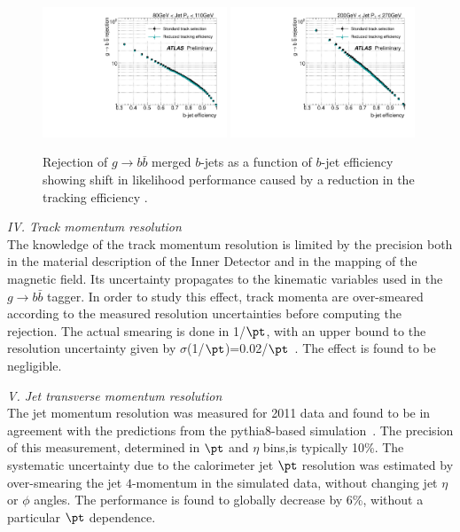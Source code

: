 \begin{figure}[tp]
\centering
\includegraphics[width=0.49\textwidth]{FIGS/systematics/LlhoodKDE_ISO_TrackingUncertaintyTest_rejvseff080.pdf}
\includegraphics[width=0.49\textwidth]{FIGS/systematics/LlhoodKDE_ISO_TrackingUncertaintyTest_rejvseff200.pdf}
\caption{Rejection of $g\rightarrow b \bar{b}$ merged $b$-jets as a function of $b$-jet efficiency showing shift in likelihood performance caused by a reduction in the tracking efficiency .}
\label{fig:trackefficiency}
\end{figure}

\vspace{3mm}
{\em IV. Track momentum resolution}
\\[3mm]
The knowledge of the track momentum resolution is limited by the precision both in the material description of the Inner Detector and in the mapping of the magnetic field. Its uncertainty propagates to the kinematic variables used in the 
$g\rightarrow b \bar{b}$ tagger. In order to study this effect, track momenta are over-smeared according to the measured resolution uncertainties before computing the rejection. The actual smearing is done in 1/$\pt$, with an upper bound to the resolution uncertainty given by $\sigma$(1/$\pt$)=0.02/$\pt$~\cite{ATLAS-CONF-2010-009}. The effect is found to be negligible. %

\vspace{3mm}
{ \em V. Jet transverse momentum resolution}
\\[3mm]
The jet momentum resolution was measured for 2011 data and found to be in agreement with the predictions from the {\sc pythia8}-based simulation~\cite{JER2011}. The precision of this measurement, determined in $\pt$ and $\eta$ bins,is typically 10\%.
The systematic uncertainty due to the calorimeter jet $\pt$ resolution was estimated by over-smearing the jet $4$-momentum in the simulated data, without changing jet $\eta$ or $\phi$ angles. The performance is found to globally decrease by 6\%, without a particular $\pt$ dependence.

